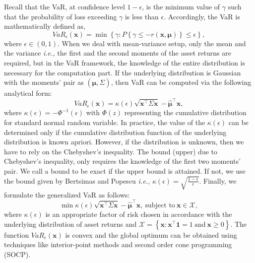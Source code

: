 \documentclass[12pt]{article}
\numberwithin{equation}{section}
\begin{document}
Recall that the VaR, at confidence level $1-\epsilon$, is the minimum value of $\gamma$ such that the probability of loss exceeding $\gamma$ is less than $\epsilon$. Accordingly, the VaR is mathematically defined as,
\begin{equation}
VaR_{\epsilon}(\mathbf{x})=\min\left\{\gamma:P\left\{\gamma \leq -r(\mathbf{x},\boldsymbol{\mu})\right\} \leq \epsilon \right\},
\label{fig:var_basic}
\end{equation}
where $\epsilon \in (0,1)$. When we deal with mean-variance setup, only the mean and the variance \textit{i.e.,} the first and the second moments of the asset returns are required, but in the VaR framework, the knowledge of the entire distribution is necessary for the computation part. If the underlying distribution is Gaussian with the moments' pair as $\displaystyle\left(\hat{\boldsymbol{\mu}},\Sigma\right)$, then VaR can be computed via the following analytical form:
\begin{equation}
VaR_{\epsilon}(\mathbf{x})=\kappa(\epsilon)\sqrt{\mathbf{x}^{\top}\Sigma \mathbf{x}}-\hat{\boldsymbol{\mu}}^{\top}\mathbf{x},
\label{eqn:kappa_eqn}
\end{equation}
where $\displaystyle{\kappa(\epsilon)=-\Phi^{-1}(\epsilon)}$ with $\Phi(z)$ representing the cumulative distribution for standard normal random variable. In practice, the value of the $\displaystyle{\kappa(\epsilon)}$ can be determined only if the cumulative distribution function of the underlying distribution is known apriori. However, if the distribution is unknown, then we have to rely on the Chebyshev's inequality. The bound (upper) due to Chebyshev's inequality, only requires the knowledge of the first two moments' pair. We call a bound to be exact if the upper bound is attained. If not, we use the bound given by Bertsimas and Popescu \cite{bert05} \textit{i.e.,} $\displaystyle{\kappa(\epsilon)=\sqrt{\frac{1-\epsilon}{\epsilon}}}$. Finally, we formulate the generalized VaR as follows:
\begin{equation}
\min \kappa(\epsilon)\sqrt{\mathbf{x}^{\top}\Sigma \mathbf{x}}-\hat{\boldsymbol{\mu}}^{\top}\mathbf{x},~\text{subject to}~
\mathbf{x} \in \mathcal{X},
\label{fig:var_general}
\end{equation}
where $\displaystyle{\kappa(\epsilon)}$ is an appropriate factor of risk chosen in accordance with the underlying distribution of asset returns and $\displaystyle{\mathcal{X}=\left\{\mathbf{x}: \mathbf{x}^{\top}\mathbf{1}=1~\text{and}~\mathbf{x} \geq 0 \right\}}$. The function $VaR_{\epsilon}(\mathbf{x})$ is convex and the global optimum can be obtained using techniques like interior-point methods and second order cone programming (SOCP).
\end{document}
